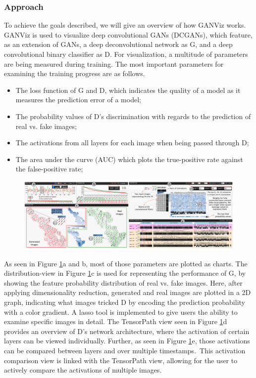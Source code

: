 \documentclass{acmsiggraph}               %
\begin{document}
\subsubsection{Approach}
To achieve the goals described, we will give an overview of how GANViz works. GANViz is used to visualize deep convolutional GANs (DCGANs), which feature, as an extension of GANs, a deep deconvolutional network as G, and a deep convolutional binary classifier as D. For visualization, a multitude of parameters are being measured during training. The most important parameters for examining the training progress are as follows.

\begin{itemize}
  \item The loss function of G and D, which indicates the quality of a model as it measures the prediction error of a model;
  \item The probability values of D's discrimination with regards to the prediction of real vs. fake images;
  \item The activations from all layers for each image when being passed through D;
  \item The area under the curve (AUC) which plots the true-positive rate against the false-positive rate;
\end{itemize}

\begin{figure}
  \centering
  \includegraphics[width=\textwidth]{ganviz}
  \caption{\protect\cite{Wang}}
  \label{fig:ganviz}
\end{figure}

As seen in Figure \ref{fig:ganviz}a and b, most of those parameters are plotted as charts. The distribution-view in Figure \ref{fig:ganviz}c is used for representing the performance of G, by showing the feature probability distribution of real vs. fake images. Here, after applying dimensionality reduction, generated and real images are plotted in a 2D graph, indicating what images tricked D by encoding the prediction probability with a color gradient. A lasso tool is implemented to give users the ability to examine specific images in detail. The TensorPath view seen in Figure \ref{fig:ganviz}d provides an overview of D's network architecture, where the activation of certain layers can be viewed individually. Further, as seen in Figure \ref{fig:ganviz}e, those activations can be compared between layers and over multiple timestamps. This activation comparison view is linked with the TensorPath view, allowing for the user to actively compare the activations of multiple images.
\end{document}
